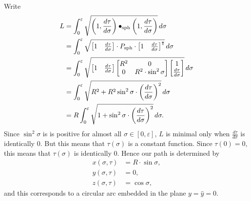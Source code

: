 \documentclass[newpage,hints,handout]{ximera}
\begin{document}
\begin{problem}
  \begin{freeResponse}
    Write
    \begin{align*}
    L  &=\int_{0}^{\varepsilon} \sqrt{\left(1,\dd[\tau]{\sigma}\right)\bullet_\mathrm{sph} \left(1,\dd[\tau]{\sigma}\right)}\d\sigma\\
    &= \int_{0}^{\varepsilon} \sqrt{
      \begin{bmatrix} 1 & \dd[\tau]{\sigma}
      \end{bmatrix} \cdot P_\mathrm{sph}\cdot
      \begin{bmatrix} 1 & \dd[\tau]{\sigma}
      \end{bmatrix}^\transpose}\d\sigma \\
    &= \int_{0}^{\varepsilon} \sqrt{
      \begin{bmatrix} 1 & \dd[\tau]{\sigma}
      \end{bmatrix}
      \begin{bmatrix}
        R^2 & 0 \\
        0 & R^2\cdot\sin^2 \sigma
      \end{bmatrix}
      \begin{bmatrix} 1 \\ \dd[\tau]{\sigma}
    \end{bmatrix}}\d\sigma \\
    &= \int_{0}^{\varepsilon} \sqrt{
      R^2+R^2\sin^{2}\sigma\cdot \left(\frac{d\tau }{d\sigma}\right)^{2}
    }\d\sigma \\
    &= R\int_{0}^{\varepsilon} \sqrt{
      1+\sin^{2}\sigma\cdot \left(\frac{d\tau }{d\sigma}\right)^{2}
    }\d\sigma.
    \end{align*}
   Since $\sin^{2}\sigma$ is is positive for almost all $\sigma\in[
     0,\varepsilon] $, $L$ is minimal only when
   $\frac{d\tau}{d\sigma}$ is identically $0$. But this means that
   $\tau\left( \sigma\right) $ is a constant function. Since
   $\tau\left( 0\right) =0$, this means that $\tau\left( \sigma\right)
   $ is identically $0$. Hence our path is determined by
   \begin{align*}
     x(\sigma,\tau) &=R\cdot \sin\sigma,\\
     y(\sigma,\tau) &=0,\\
     z(\sigma,\tau) &=\cos \sigma,
   \end{align*}
   and this corresponds to a circular arc embedded in the plane
   $y=\hat{y}=0$.
  \end{freeResponse}

\end{problem}
\end{document}
